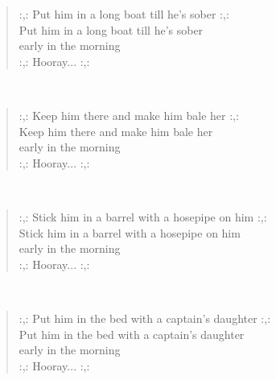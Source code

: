 \noindent\begin{minipage}{\linewidth}
\begin{verse}
	\hspace{0pt-\widthof{:,: }}:,: Put him in a long boat till he's sober :,:\\
	Put him in a long boat till he's sober\\
	early in the morning\\
	\hspace{0pt-\widthof{:,: }}:,: Hooray... :,:\\
\end{verse}
\end{minipage}\\[10pt]
\noindent\begin{minipage}{\linewidth}
\begin{verse}
	\hspace{0pt-\widthof{:,: }}:,: Keep him there and make him bale her :,:\\
	Keep him there and make him bale her\\
	early in the morning\\
	\hspace{0pt-\widthof{:,: }}:,: Hooray... :,:\\
\end{verse}
\end{minipage}\\[10pt]
\noindent\begin{minipage}{\linewidth}
\begin{verse}
	\hspace{0pt-\widthof{:,: }}:,: Stick him in a barrel with a hosepipe on him :,:\\
	Stick him in a barrel with a hosepipe on him\\
	early in the morning\\
	\hspace{0pt-\widthof{:,: }}:,: Hooray... :,:\\
\end{verse}
\end{minipage}\\[10pt]
\noindent\begin{minipage}{\linewidth}
\begin{verse}
	\hspace{0pt-\widthof{:,: }}:,: Put him in the bed with a captain's daughter :,:\\
	Put him in the bed with a captain's daughter\\
	early in the morning\\
	\hspace{0pt-\widthof{:,: }}:,: Hooray... :,:\\
\end{verse}
\end{minipage}\\[10pt]
